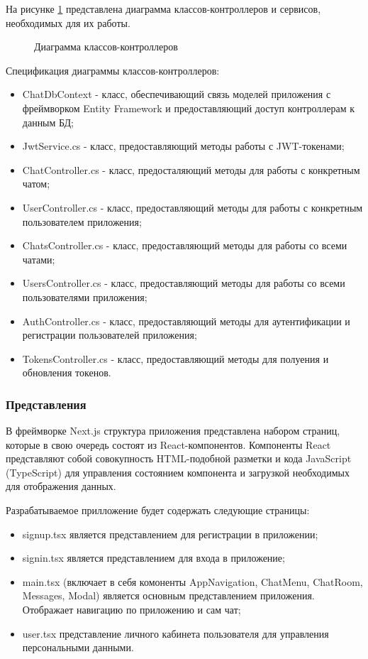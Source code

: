 На рисунке \ref{controllers:image} представлена диаграмма классов-контроллеров и сервисов, необходимых для их работы.

\begin{landscape}
	\begin{figure}[ht]
		\caption{Диаграмма классов-контроллеров}
		\label{controllers:image}
	\end{figure}
\end{landscape}

Спецификация диаграммы классов-контроллеров:
\begin{itemize}
	\item ChatDbContext - класс, обеспечивающий связь моделей приложения с фреймворком Entity Framework и предоставляющий доступ контроллерам к данным БД\cite{ef};
	\item JwtService.cs - класс, предоставляющий методы работы с JWT-токенами;
	\item ChatController.cs - класс, предосталяющий методы для работы с конкретным чатом;
	\item UserController.cs - класс, предоставляющий методы для работы с конкретным пользователем приложения;
	\item ChatsController.cs - класс, предоставляющий методы для работы со всеми чатами;
	\item UsersController.cs - класс, предоставляющий методы для работы со всеми пользователями приложения;
	\item AuthController.cs - класс, предоставляющий методы для аутентификации и регистрации пользователей приложения;
	\item TokensController.cs - класс, предоставляющий методы для полуения и обновления токенов.
\end{itemize}

\subsubsection{Представления}

В фреймворке Next.js структура приложения представлена набором страниц, которые в свою очередь состоят из React-компонентов. Компоненты React представляют собой совокупность HTML-подобной разметки и кода JavaScript (TypeScript) для управления состоянием компонента и загрузкой необходимых для отображения данных\cite{nextjs}.

Разрабатываемое прилложение будет содержать следующие страницы:
\begin{itemize}
	\item signup.tsx является представлением для регистрации в приложении;
	\item signin.tsx является представлением для входа в приложение;
	\item main.tsx (включает в себя комоненты AppNavigation, ChatMenu, ChatRoom, Messages, Modal) является основным представлением приложения. Отображает навигацию по приложению и сам чат;
	\item user.tsx представление личного кабинета пользователя для управления персональными данными.
\end{itemize}

